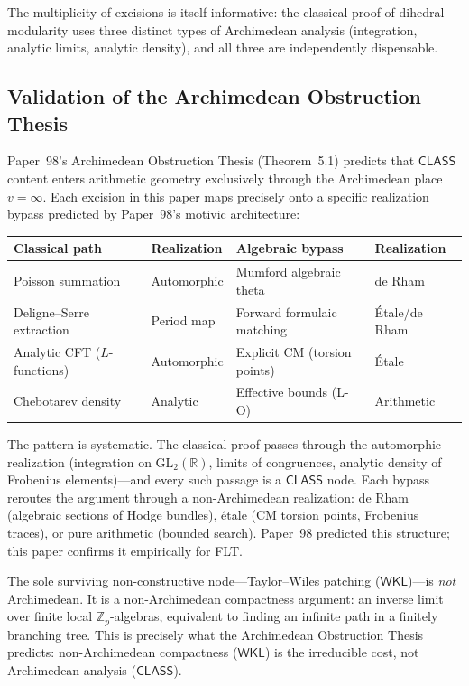 \documentclass[11pt,a4paper]{article}
\theoremstyle{plain}
\theoremstyle{definition}
\newcommand{\WKL}{\textsf{WKL}}
\newcommand{\CLASS}{\textsf{CLASS}}
\newcommand{\Z}{\mathbb{Z}}
\newcommand{\R}{\mathbb{R}}
\newcommand{\GL}{\mathrm{GL}}
\begin{document}
The multiplicity of excisions is itself informative: the classical proof of dihedral modularity uses three distinct types of Archimedean analysis (integration, analytic limits, analytic density), and all three are independently dispensable.

\subsection{Validation of the Archimedean Obstruction Thesis}

Paper~98's Archimedean Obstruction Thesis (Theorem~5.1) predicts that $\CLASS$ content enters arithmetic geometry exclusively through the Archimedean place~$v = \infty$.
Each excision in this paper maps precisely onto a specific realization bypass predicted by Paper~98's motivic architecture:

\begin{center}
\begin{tabular}{@{}llll@{}}
\toprule
\textbf{Classical path} & \textbf{Realization} & \textbf{Algebraic bypass} & \textbf{Realization} \\
\midrule
Poisson summation & Automorphic & Mumford algebraic theta & de Rham \\
Deligne--Serre extraction & Period map & Forward formulaic matching & \'Etale/de Rham \\
Analytic CFT ($L$-functions) & Automorphic & Explicit CM (torsion points) & \'Etale \\
Chebotarev density & Analytic & Effective bounds (L-O) & Arithmetic \\
\bottomrule
\end{tabular}
\end{center}

\noindent The pattern is systematic.
The classical proof passes through the automorphic realization (integration on $\GL_2(\R)$, limits of congruences, analytic density of Frobenius elements)---and every such passage is a $\CLASS$ node.
Each bypass reroutes the argument through a non-Archimedean realization: de Rham (algebraic sections of Hodge bundles), \'etale (CM torsion points, Frobenius traces), or pure arithmetic (bounded search).
Paper~98 predicted this structure; this paper confirms it empirically for FLT.

The sole surviving non-constructive node---Taylor--Wiles patching ($\WKL$)---is \emph{not} Archimedean.
It is a non-Archimedean compactness argument: an inverse limit over finite local $\Z_p$-algebras, equivalent to finding an infinite path in a finitely branching tree.
This is precisely what the Archimedean Obstruction Thesis predicts: non-Archimedean compactness ($\WKL$) is the irreducible cost, not Archimedean analysis ($\CLASS$).
\end{document}
